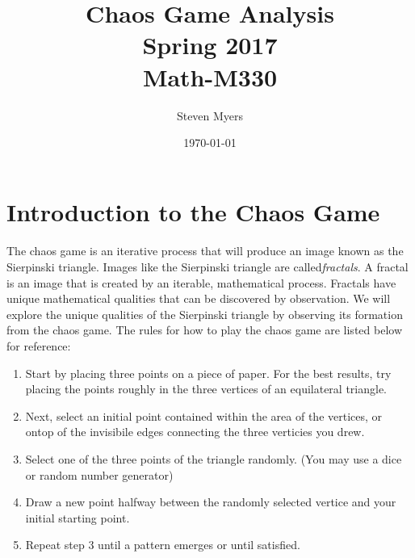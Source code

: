 \documentclass{article}
\begin{document}
\title{Chaos Game Analysis\\ Spring 2017\\ Math-M330}         %
\author{Steven Myers}        %
\date{\today}          %
\maketitle


\makeatother     %

\pagestyle{plain}

\section*{Introduction to the Chaos Game}

\paragraph{}
The chaos game is an iterative process that will produce an image known as the Sierpinski triangle. Images like the Sierpinski triangle are called\textit{fractals}. A fractal is an image that is created by an iterable, mathematical process. Fractals have unique mathematical qualities that can be discovered by observation. We will explore the unique qualities of the Sierpinski triangle by observing its formation from the chaos game. The rules for how to play the chaos game are listed below for reference:
\begin{enumerate}
    \item
    Start by placing three points on a piece of paper. For the best results, try placing the points roughly in the three vertices of an equilateral triangle.
    \item
    Next, select an initial point contained within the area of the vertices, or ontop of the invisibile edges connecting the three verticies you drew.
    \item
    Select one of the three points of the triangle randomly. (You may use a dice or random number generator)
    \item
    Draw a new point halfway between the randomly selected vertice and your initial starting point.
    \item
    Repeat step 3 until a pattern emerges or until satisfied.
\end{enumerate}
\end{document}
